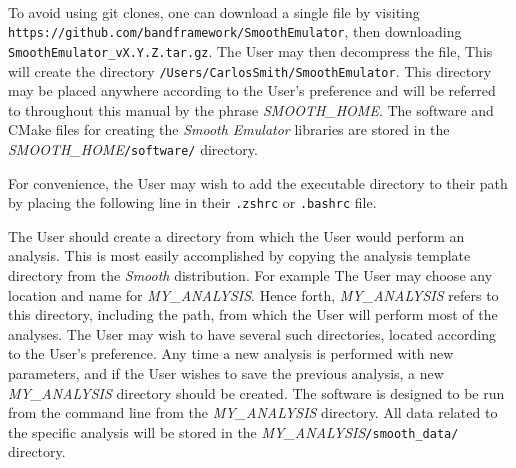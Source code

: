 \documentclass[UserManual.tex]{subfiles}
\begin{document}
\begin{sloppypar}
\\
To avoid using git clones, one can download a single file by visiting {\tt https://github.com/bandframework/SmoothEmulator}, then downloading {\tt SmoothEmulator\_vX.Y.Z.tar.gz}. The User may then decompress the file,
\vspace*{-8pt}{\tt \begin{Verbatim}[commandchars=\\\{\}]
/Users/CarlosSmith% \textcolor{darkred}{gunzip SmoothEmulator_vX.Y.Z.tar.gz}
/Users/CarlosSmith% \textcolor{darkred}{tar -xf SmoothEmulator_vX.Y.Z.tar}
\end{Verbatim}
}\vspace*{-8pt}
This will create the directory {\tt /Users/CarlosSmith/SmoothEmulator}. This directory may be placed anywhere according to the User's preference and will be referred to throughout this manual by the phrase \textit{SMOOTH\_HOME}. The software and CMake files for creating the {\it Smooth Emulator} libraries are stored in the \textit{SMOOTH\_HOME}{\tt /software/} directory.

For convenience, the User may wish to add the executable directory to their path by placing the following line in their {\tt .zshrc} or {\tt .bashrc} file.
\vspace*{-8pt}{\tt \begin{Verbatim}[commandchars=\\\{\}]
% \textcolor{darkred}{export PATH=${PATH}:\textit{SMOOTH_HOME}/bin}
\end{Verbatim}
}\vspace*{-8pt}

The User should create a directory from which the User would perform an analysis. This is most easily accomplished by copying the analysis template directory from the {\it Smooth} distribution. For example
\vspace*{-8pt}{\tt \begin{Verbatim}[commandchars=\\\{\}]
% \textcolor{darkred}{cp -r \textit{SMOOTH_HOME}/AnalysisTemplate \textit{MY_ANALYSIS}}
\end{Verbatim}
}\vspace*{-8pt}
The User may choose any location and name for \textit{MY\_ANALYSIS}. Hence forth, \textit{MY\_ANALYSIS} refers to this directory, including the path, from which the User will perform most of the analyses. The User may wish to have several such directories, located according to the User's preference. Any time a new analysis is performed with new parameters, and if the User wishes to save the previous analysis, a new \textit{MY\_ANALYSIS} directory should be created. The software is designed to be run from the command line from the  \textit{MY\_ANALYSIS} directory. All data related to the specific analysis will be stored in the \textit{MY\_ANALYSIS}{\tt/smooth\_data/} directory.


\end{sloppypar}
\end{document}
